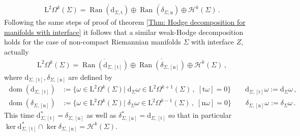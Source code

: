 \begin{remark}
\begin{align}
		\mathrm{L}^2\Omega^k(\Sigma)=
		\overline{\operatorname{Ran}(\mathrm{d}_{\Sigma,\mathrm{t}})}\oplus
		\overline{\operatorname{Ran}(\delta_{\Sigma,\mathrm{n}})}\oplus
		\mathcal{H}^k(\Sigma)\,.
	\end{align}
	Following the same steps of proof of theorem \ref{Thm: Hodge decomposition for manifolds with interface} it follows that a similar weak-Hodge decomposition holds for the case of non-compact Riemannian manifolds $\Sigma$ with interface $Z$, actually
	\begin{align}\label{Eqn: weak-Hodge decomposition for interface}
		\mathrm{L}^2\Omega^k(\Sigma)=
		\overline{\operatorname{Ran}(\mathrm{d}_{\Sigma,[\mathrm{t}]})}\oplus
		\overline{\operatorname{Ran}(\delta_{\Sigma,[\mathrm{n}]})}\oplus
		\mathcal{H}^k(\Sigma)\,,
	\end{align}
	where $\mathrm{d}_{\Sigma,[\mathrm{t}]}, \delta_{\Sigma,[\mathrm{n}]}$ are defined by
	\begin{align*}
	\operatorname{dom}(\mathrm{d}_{\Sigma,[\mathrm{t}]})&:=\lbrace
	\omega\in\mathrm{L}^2\Omega^k(\Sigma)|\;\mathrm{d}_\Sigma\omega\in\mathrm{L}^2\Omega^{k+1}(\Sigma)\,,\;[\mathrm{t}\omega]=0\rbrace\qquad
	\mathrm{d}_{\Sigma,[\mathrm{t}]}\omega:=\mathrm{d}_\Sigma\omega\,,\\
	\operatorname{dom}(\delta_{\Sigma,[\mathrm{n}]})&:=\lbrace
	\omega\in\mathrm{L}^2\Omega^k(\Sigma)|\;\delta_\Sigma\omega\in\mathrm{L}^2\Omega^{k-1}(\Sigma)\,,\;[\mathrm{n}\omega]=0\rbrace\qquad
	\delta_{\Sigma,[\mathrm{n}]}\omega:=\delta_\Sigma\omega\,.
	\end{align*}
	This time $\mathrm{d}_{\Sigma,[\mathrm{t}]}^*=\delta_{\Sigma,[\mathrm{n}]}$ as well as $\delta_{\Sigma,[\mathrm{n}]}^*=\mathrm{d}_{\Sigma,[\mathrm{t}]}$ so that in particular $\ker\mathrm{d}_{\Sigma,[\mathrm{t}]}^*\cap\ker\delta_{\Sigma,[\mathrm{n}]}=\mathcal{H}^k(\Sigma)$.
	\\
\end{remark}
